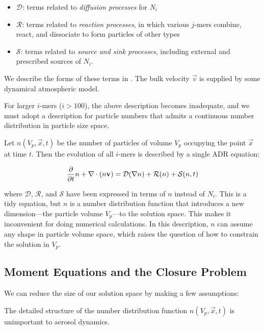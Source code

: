 \begin{itemize}
  \item $\mathcal{D}$: terms related to {\it diffusion processes} for $N_i$
  \item $\mathcal{R}$: terms related to {\it reaction processes}, in which
        various $j$-mers combine, react, and dissociate to form particles of
        other types
  \item $\mathcal{S}$: terms related to {\it source and sink processes},
        including external and prescribed sources of $N_i$.
\end{itemize}

We describe the forms of these terms in . The bulk
velocity $\vec{v}$ is supplied by some dynamical atmospheric model.

For larger $i$-mers ($i > 100$), the above description becomes inadequate, and
we must adopt a description for particle numbers that admits a continuous
number distribution in particle size space.

Let $n(V_p, \vec{x}, t)$ be the number of particles of volume $V_p$ occupying
the point $\vec{x}$ at time $t$. Then the evolution of all $i$-mers is described
by a single ADR equation:

\begin{equation}\labeleq{continuous_dndt}
  \ddt{n} + \div{(n\vec{v})} = \mathcal{D}(\nabla n) +
                               \mathcal{R}(n) +
                               \mathcal{S}(n, t)
\end{equation}

where $\mathcal{D}$, $\mathcal{R}$, and $\mathcal{S}$ have been expressed
in terms of $n$ instead of $N_i$. This is a tidy equation, but $n$ is a
number distribution function that introduces a new dimension---the particle volume
$V_p$---to the solution space. This makes it inconvenient for doing numerical
calculations. In this description, $n$ can assume any shape in particle volume
space, which raises the question of how to constrain the solution in $V_p$.

\subsection*{Moment Equations and the Closure Problem}
We can reduce the size of our solution space by making a few assumptions:

\begin{assume}
  The detailed structure of the number distribution function
        $n(V_p, \vec{x}, t)$ is unimportant to aerosol dynamics.
\end{assume}

